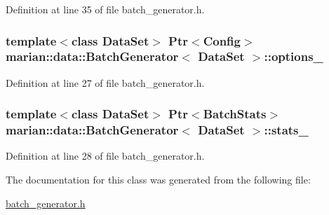 Definition at line 35 of file batch\+\_\+generator.\+h.

\subsubsection[{\texorpdfstring{options\+\_\+}{options_}}]{\setlength{\rightskip}{0pt plus 5cm}template$<$class Data\+Set$>$ {\bf Ptr}$<${\bf Config}$>$ {\bf marian\+::data\+::\+Batch\+Generator}$<$ Data\+Set $>$\+::options\+\_\+\hspace{0.3cm}{\ttfamily [private]}}\hypertarget{classmarian_1_1data_1_1BatchGenerator_a8569748b3bca0d5f30e6e2f4def1b535}{}\label{classmarian_1_1data_1_1BatchGenerator_a8569748b3bca0d5f30e6e2f4def1b535}


Definition at line 27 of file batch\+\_\+generator.\+h.

\subsubsection[{\texorpdfstring{stats\+\_\+}{stats_}}]{\setlength{\rightskip}{0pt plus 5cm}template$<$class Data\+Set$>$ {\bf Ptr}$<${\bf Batch\+Stats}$>$ {\bf marian\+::data\+::\+Batch\+Generator}$<$ Data\+Set $>$\+::stats\+\_\+\hspace{0.3cm}{\ttfamily [private]}}\hypertarget{classmarian_1_1data_1_1BatchGenerator_ac951bf49ac81aa01d834391dc1579096}{}\label{classmarian_1_1data_1_1BatchGenerator_ac951bf49ac81aa01d834391dc1579096}


Definition at line 28 of file batch\+\_\+generator.\+h.



The documentation for this class was generated from the following file\+:\begin{DoxyCompactItemize}
\item 
\hyperlink{batch__generator_8h}{batch\+\_\+generator.\+h}\end{DoxyCompactItemize}
